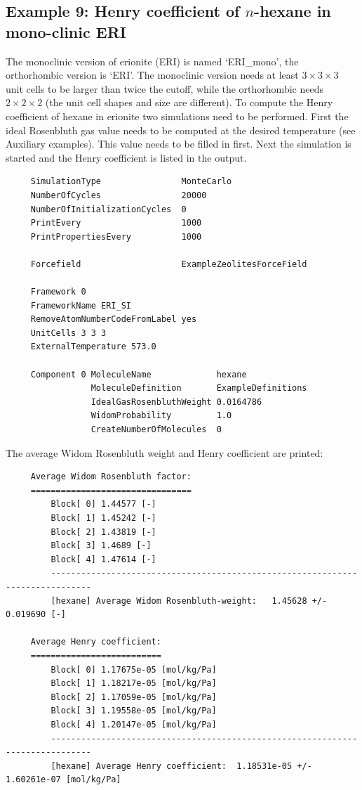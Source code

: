 \subsection*{Example 9: Henry coefficient of $n$-hexane in mono-clinic ERI}
The monoclinic version of erionite (ERI) is named `ERI\_mono', the orthorhombic version is `ERI'.
The monoclinic version needs at least $3\times3\times3$ unit cells to be larger than twice the cutoff,
while the orthorhombic needs $2\times2\times2$ (the unit cell shapes and size are different).
To compute the Henry coefficient of hexane in erionite two simulations need to be performed. First
the ideal Rosenbluth gas value needs to be computed at the desired temperature (see Auxiliary examples).
This value needs to be filled in first. Next the simulation is started and the Henry coefficient is
listed in the output.
\begin{tiny}
\begin{verbatim}
     SimulationType                MonteCarlo
     NumberOfCycles                20000
     NumberOfInitializationCycles  0
     PrintEvery                    1000
     PrintPropertiesEvery          1000
     
     Forcefield                    ExampleZeolitesForceField
     
     Framework 0
     FrameworkName ERI_SI
     RemoveAtomNumberCodeFromLabel yes
     UnitCells 3 3 3
     ExternalTemperature 573.0
     
     Component 0 MoleculeName             hexane
                 MoleculeDefinition       ExampleDefinitions
                 IdealGasRosenbluthWeight 0.0164786
                 WidomProbability         1.0
                 CreateNumberOfMolecules  0
\end{verbatim}
\end{tiny}

\noindent
The average Widom Rosenbluth weight and Henry coefficient are printed:
\begin{tiny}
\begin{verbatim}
     Average Widom Rosenbluth factor:
     ================================
         Block[ 0] 1.44577 [-]
         Block[ 1] 1.45242 [-]
         Block[ 2] 1.43819 [-]
         Block[ 3] 1.4689 [-]
         Block[ 4] 1.47614 [-]
         ------------------------------------------------------------------------------
         [hexane] Average Widom Rosenbluth-weight:   1.45628 +/- 0.019690 [-]
     
     Average Henry coefficient:
     ==========================
         Block[ 0] 1.17675e-05 [mol/kg/Pa]
         Block[ 1] 1.18217e-05 [mol/kg/Pa]
         Block[ 2] 1.17059e-05 [mol/kg/Pa]
         Block[ 3] 1.19558e-05 [mol/kg/Pa]
         Block[ 4] 1.20147e-05 [mol/kg/Pa]
         ------------------------------------------------------------------------------
         [hexane] Average Henry coefficient:  1.18531e-05 +/- 1.60261e-07 [mol/kg/Pa]
\end{verbatim}
\end{tiny}

